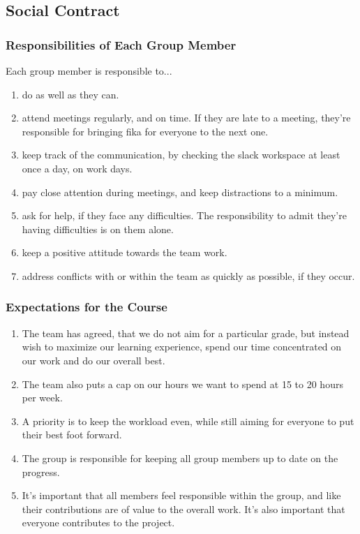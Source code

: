 

\subsection*{Social Contract}

\subsubsection*{Responsibilities of Each Group Member}
Each group member is responsible to...
\begin{enumerate}
    \item do as well as they can.
    \item attend meetings regularly, and on time. If they are late to a meeting, they're responsible for bringing fika for everyone to the next one.
    \item keep track of the communication, by checking the slack workspace at least once a day, on work days.
    \item pay close attention during meetings, and keep distractions to a minimum.
    \item ask for help, if they face any difficulties. The responsibility to admit they're having difficulties is on them alone.
    \item keep a positive attitude towards the team work. 
    \item address conflicts with or within the team as quickly as possible, if they occur.
\end{enumerate}


\subsubsection*{Expectations for the Course}
\begin{enumerate}
    \item The team has agreed, that we do not aim for a particular grade, but instead wish to maximize our learning experience, spend our time concentrated on our work and do our overall best.
    \item The team also puts a cap on our hours we want to spend at 15 to 20 hours per week.
    \item A priority is to keep the workload even, while still aiming for everyone to put their best foot forward.
    \item The group is responsible for keeping all group members up to date on the progress.
    \item It's important that all members feel responsible within the group, and like their contributions are of value to the overall work. It's also important that everyone contributes to the project.
\end{enumerate}


